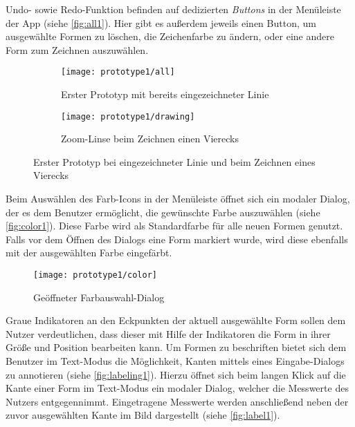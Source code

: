 Undo- sowie Redo-Funktion befinden auf dedizierten \emph{Buttons} in der Menüleiste der App (siehe \autoref{fig:all1}).
Hier gibt es außerdem jeweils einen Button, um ausgewählte Formen zu löschen, die Zeichenfarbe zu ändern, oder eine andere Form zum Zeichnen auszuwählen. \\

\begin{figure}[h]
  \begin{subfigure}[t]{0.4\textwidth}
    \texttt{[image: prototype1/all]}
    \caption{Erster Prototyp mit bereits eingezeichneter Linie}
    \label{fig:all1}
  \end{subfigure}
  \begin{subfigure}[t]{0.4\textwidth}
    \texttt{[image: prototype1/drawing]}
    \caption{Zoom-Linse beim Zeichnen einen Vierecks}
    \label{fig:draw1}
  \end{subfigure}
  \centering
  \caption{Erster Prototyp bei eingezeichneter Linie und beim Zeichnen eines Vierecks}
\end{figure}

\noindent
Beim Auswählen des Farb-Icons in der Menüleiste öffnet sich ein modaler Dialog, der es dem Benutzer ermöglicht, die gewünschte Farbe auszuwählen (siehe \autoref{fig:color1}).
Diese Farbe wird als Standardfarbe für alle neuen Formen genutzt.
Falls vor dem Öffnen des Dialogs eine Form markiert wurde, wird diese ebenfalls mit der ausgewählten Farbe eingefärbt. \\

\begin{wrapfigure}{R}{0.5\textwidth}
  \centering
  \texttt{[image: prototype1/color]}
  \caption{Geöffneter Farbauswahl-Dialog}
  \label{fig:color1}
\end{wrapfigure}

Graue Indikatoren an den Eckpunkten der aktuell ausgewählte Form sollen dem Nutzer verdeutlichen, dass dieser mit Hilfe der Indikatoren die Form in ihrer Größe und Position bearbeiten kann.
Um Formen zu beschriften bietet sich dem Benutzer im Text-Modus die Möglichkeit, Kanten mittels eines Eingabe-Dialogs zu annotieren (siehe \autoref{fig:labeling1}).
Hierzu öffnet sich beim langen Klick auf die Kante einer Form im Text-Modus ein modaler Dialog, welcher die Messwerte des Nutzers entgegennimmt.
Eingetragene Messwerte werden anschließend neben der zuvor ausgewählten Kante im Bild dargestellt (siehe \autoref{fig:label1}). 

